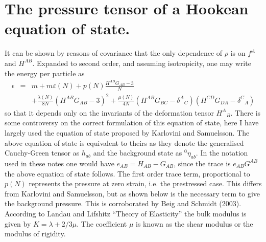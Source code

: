 \section{The pressure tensor of a Hookean equation of state.}

It can be shown by reasons of covariance that the only dependence of $\rho$ is on $f^A$ and $H^{AB}$. Expanded to second order, and assuming isotropicity, one may write the energy per particle as 
\begin{eqnarray}
\label{eqn:eos}
\nonumber\epsilon & = & \displaystyle{m + m\varepsilon(N) + p(N)\frac{H^{AB}G_{AB}-3}{N}} \\
 && +  \frac{\lambda(N)}{8N}\left(H^{AB}G_{AB}-3\right)^2 + \frac{\mu(N)}{4N}\left(H^{AB}G_{BC} - \delta^{A}{}_C\right)\left(H^{CD}G_{DA} - \delta^{C}{}_A\right)
\end{eqnarray}
so that it depends only on the invariants of the deformation tensor $H^{A}{}_{B}$. There is some controversy on the correct formulation of this equation of state, here I have largely used the equation of state proposed by Karlovini and Samuelsson. The above equation of state is equivalent to theirs as they denote the generalised Cauchy-Green tensor as $h_{ab}$ and the background state as ${}^0\eta_{ab}$. In the notation used in these notes one would have $e_{AB} = H_{AB} - G_{AB}$, since the trace is $e_{AB}G^{AB}$ the above equation of state follows. The first order trace term, proportional to $p(N)$ represents the pressure at zero strain, i.e. the prestressed case. This differs from Karlovini and Samuelsson, but as shown below is the necessary term to give the background pressure. This is corroborated by Beig and Schmidt (2003). According to Landau and Lifshitz ``Theory of Elasticity'' the bulk modulus is given by $K=\lambda + 2/3 \mu$. The coefficient $\mu$ is known as the shear modulus or the modulus of rigidity.


